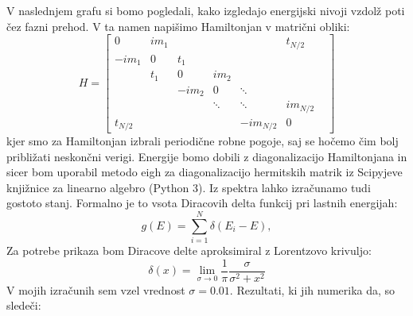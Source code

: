 V naslednjem grafu si bomo pogledali, kako izgledajo energijski nivoji vzdolž poti čez fazni prehod. 
V ta namen napišimo Hamiltonjan v matrični obliki:
\[
H = \begin{bmatrix} 
0 & i m_1 &  &  &  & t_{N/2}\\
-i m_1 & 0 & t_1 &  & &  \\
 & t_1 & 0 & im_2 &  &  \\
 &  & -im_2 & 0& \ddots&  & \\
 &  &  & \ddots & \ddots & im_{N/2}  \\
t_{N/2} & & &  & -i m_{N/2} & 0  
    \end{bmatrix}
\]
kjer smo za Hamiltonjan izbrali periodične robne pogoje, saj se hočemo čim bolj približati neskončni verigi. Energije bomo dobili z diagonalizacijo Hamiltonjana in sicer bom uporabil metodo eigh za diagonalizacijo hermitskih matrik iz Scipyjeve knjižnice za linearno algebro (Python 3).
Iz spektra lahko izračunamo tudi gostoto stanj. Formalno je to vsota Diracovih delta funkcij pri lastnih energijah:
\begin{equation}
g(E) = \sum_{i=1}^N \delta (E_i - E),
\end{equation}
Za potrebe prikaza bom Diracove delte aproksimiral z Lorentzovo krivuljo:
\begin{equation}
\delta (x) = \lim_{\sigma \to 0} \frac{1}{\pi} \frac{\sigma}{\sigma^2 + x^2}
\end{equation}
V mojih izračunih sem vzel vrednost $\sigma=0.01$.
Rezultati, ki jih numerika da, so sledeči:
